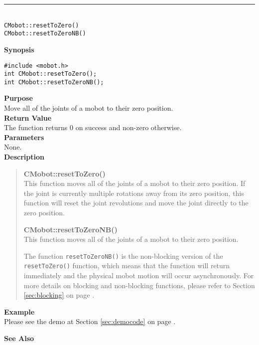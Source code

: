 \noindent
\vspace{5pt}
\rule{4.5in}{0.015in}\\
\noindent
{\LARGE \texttt{CMobot::resetToZero()}}\\
{\LARGE \texttt{CMobot::resetToZeroNB()}}\\
{}

\noindent
{\bf Synopsis}
\vspace{-8pt}
\begin{verbatim}
#include <mobot.h>
int CMobot::resetToZero();
int CMobot::resetToZeroNB();
\end{verbatim}

\noindent
{\bf Purpose}\\
Move all of the joints of a mobot to their zero position.\\

\noindent
{\bf Return Value}\\
The function returns 0 on success and non-zero otherwise.\\

\noindent
{\bf Parameters}\\
None.\\

\noindent
{\bf Description}\\
\vspace{-12pt}
\begin{quote}
{\bf CMobot::resetToZero()}\\
This function moves all of the joints of a mobot to their zero position. If the
joint is currently multiple rotations away from its zero position, this
function will reset the joint revolutions and move the joint directly to the
zero position.

{\bf CMobot::resetToZeroNB()}\\
This function moves all of the joints of a mobot to their zero position.

The function \texttt{resetToZeroNB()} is the non-blocking version of
the \texttt{resetToZero()} function, which means that the function will return
immediately and the physical mobot motion will occur asynchronously. For
more details on blocking and non-blocking functions, please refer to 
Section \ref{sec:blocking} on page \pageref{sec:blocking}.\\
\end{quote}

\noindent
{\bf Example}\\
Please see the demo at Section \ref{sec:democode} on page \pageref{sec:democode}.\\
\noindent

\noindent
{\bf See Also}\\

